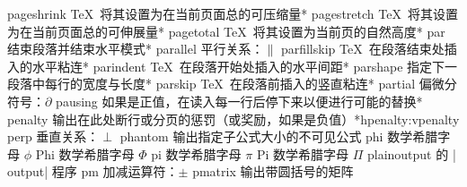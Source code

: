 \capcs pageshrink {\TeX\ 将其设置为在当前页面总的可压缩量}*{}
\capcs pagestretch {\TeX\ 将其设置为在当前页面总的可伸展量}*{}
\capcs pagetotal {\TeX\ 将其设置为当前页的自然高度}*{}
\capcs par {结束段落并结束水平模式}*{\@par}
\capcs parallel {平行关系：$\parallel$}{}{}
\capcs parfillskip {\TeX\ 在段落结束处插入的水平粘连}*{}
\capcs parindent {\TeX\ 在段落开始处插入的水平间距}*{}
\capcs parshape {指定下一段落中每行的宽度与长度}*{}
\capcs parskip {\TeX\ 在段落前插入的竖直粘连}*{}
\capcs partial {偏微分符号：$\partial$}{}{}
\capcs pausing {如果是正值，在读入每一行后停下来以便进行可能的替换}*{}
\capcstwo penalty {输出在此处断行或分页的惩罚（或奖励，如果是负值）}*{hpenalty:vpenalty}
\capcs perp {垂直关系：$\perp$}{}{}
\capcs phantom {输出指定子公式大小的不可见公式}{}{}
\capcs phi {数学希腊字母 $\phi$}{}{}
\capcs Phi {数学希腊字母 $\Phi$}{}{}
\capcs pi {数学希腊字母 $\pi$}{}{}
\capcs Pi {数学希腊字母 $\Pi$}{}{}
\capcs plainoutput {\plainTeX 的 |\\output| 程序}{}{}
\capcs pm {加减运算符：$\pm$}{}{}
\capcs pmatrix {输出带圆括号的矩阵}{}{}
